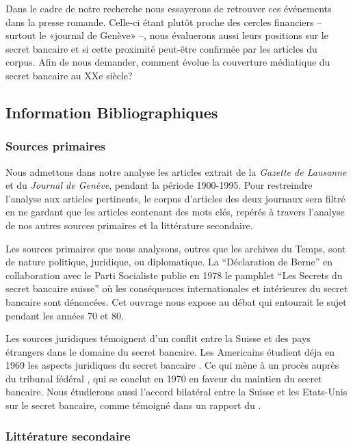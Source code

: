 \documentclass[11pt]{article}
\begin{document}
Dans le cadre de notre recherche nous essayerons de retrouver ces événements
dans la presse romande. Celle-ci étant plutôt proche des cercles financiers –
surtout le «journal de Genève» \citep{ConfClass1} –, nous évaluerons aussi
leurs positions sur le secret bancaire et si cette proximité peut-être
confirmée par les articles du corpus. Afin de nous demander, comment évolue la
couverture médiatique du secret bancaire au XXe siècle?

\subsection{Information Bibliographiques}
\subsubsection{Sources primaires}

Nous admettons dans notre analyse les articles extrait de la \textit{Gazette de
Lausanne} et du \textit{Journal de Genève}, pendant la
période 1900-1995. Pour restreindre l’analyse aux articles pertinents, le corpus
d’articles des deux journaux sera filtré en ne gardant que les articles
contenant des mots clés, repérés à travers l’analyse de nos autres sources
primaires et la littérature secondaire.

Les sources primaires que nous analysons, outres que les archives du Temps, sont
de nature politique, juridique, ou diplomatique. La “Déclaration de Berne” en
collaboration avec le Parti Socialiste publie en 1978 le pamphlet “Les Secrets
du secret bancaire suisse” \citep{GiovanniniPierLuigi1978Lsds} où les
conséquences internationales et intérieures du secret bancaire sont dénoncées.
Cet ouvrage nous expose au débat qui entourait le sujet pendant les années 70 et
80.

Les sources juridiques témoignent d'un conflit entre la Suisse et des pays
étrangers dans le domaine du secret bancaire. Les Americains étudient déja en
1969 les aspects juridiques du secret bancaire \citep{Mueller69}. Ce qui mène à
un procès auprès du tribunal fédéral \citep{tribunalFederal70}, qui se conclut
en 1970 en faveur du maintien du secret bancaire. Nous étudierons aussi l'accord
bilatéral entre la Suisse et les Etats-Unis sur le secret bancaire, comme
témoigné dans un rapport du \citet{insiderTrading83}.

\subsubsection{Littérature secondaire}
\end{document}
